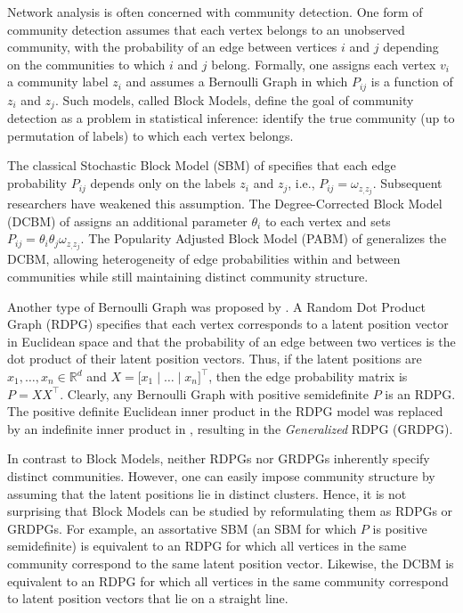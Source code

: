\documentclass[12pt]{article}
\begin{document}
Network analysis is often concerned with community detection.  One form of community detection assumes that each vertex belongs to an unobserved community, with the probability of an edge between vertices $i$ and $j$ depending on the communities to which $i$ and $j$ belong.  Formally, one assigns each vertex $v_i$ a community label $z_i$ and assumes a Bernoulli Graph in which $P_{ij}$ is a function of $z_i$ and $z_j$.  Such models, called Block Models, define the goal of community detection as a problem in statistical inference: identify the true community (up to permutation of labels) to which each vertex belongs.

The classical Stochastic Block Model (SBM) of \citet{doi:10.1080/0022250X.1971.9989788} specifies that each edge probability $P_{ij}$ depends only on the labels $z_i$ and $z_j$, i.e., $P_{ij} = \omega_{z_,z_j}$.  Subsequent researchers have weakened this assumption.   The Degree-Corrected Block Model (DCBM) of \citet{Karrer_2011} assigns an additional parameter $\theta_i$ to each vertex and sets $P_{ij} = \theta_i \theta_j \omega_{z_,z_j}$. The Popularity Adjusted Block Model (PABM) of \citet{307cbeb9b1be48299388437423d94bf1} generalizes the DCBM, allowing heterogeneity of edge probabilities within and between communities while still maintaining distinct community structure.

Another type of Bernoulli Graph was proposed by
\citet*{10.1007/978-3-540-77004-6_11}.  A Random Dot Product Graph
(RDPG) specifies that each vertex corresponds to a latent position
vector in Euclidean space and that the probability of an edge between
two vertices is the dot product of their latent position vectors.
Thus, if the latent positions are $x_1,\ldots,x_n \in \mathbb{R}^d$
and $X = \bigl[ x_1 \mid \dots \mid x_n \bigr]^\top$,
then the edge probability matrix is $P = XX^\top$.  Clearly, any
Bernoulli Graph with positive semidefinite $P$ is an RDPG.  The
positive definite Euclidean inner product in the RDPG model was
replaced by an indefinite inner product in
\citet{rubindelanchy2017statistical}, resulting in the {\em
Generalized}\/ RDPG (GRDPG).

In contrast to Block Models, neither RDPGs nor GRDPGs inherently
specify distinct communities.  However, one can easily impose
community structure by assuming that the latent positions lie in
distinct clusters.  Hence, it is not surprising that Block Models can
be studied by reformulating them as RDPGs or GRDPGs.  For example, an
assortative SBM (an SBM for which $P$ is positive semidefinite) is
equivalent to an RDPG for which all vertices in the same community
correspond to the same latent position vector.
Likewise, the DCBM is equivalent to an RDPG for which all vertices in
the same community correspond to latent position vectors that lie on a
straight line. %
\end{document}
